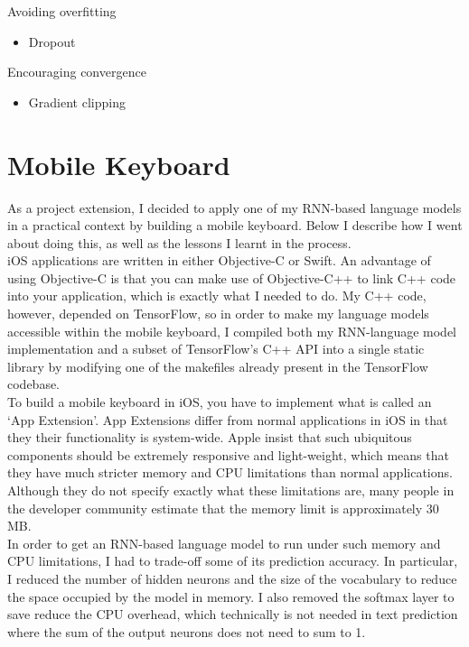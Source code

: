 \documentclass[a4paper, 12pt]{report}
\begin{document}
Avoiding overfitting
\begin{itemize}
\item
	Dropout
\end{itemize}

Encouraging convergence
\begin{itemize}
\item
	Gradient clipping
\end{itemize}

\section{Mobile Keyboard} \label{mobile_keyboard}

As a project extension, I decided to apply one of my RNN-based language models in a practical context by building a mobile keyboard. Below I describe how I went about doing this, as well as the lessons I learnt in the process. \\

iOS applications are written in either Objective-C or Swift. An advantage of using Objective-C is that you can make use of Objective-C++ to link C++ code into your application, which is exactly what I needed to do. My C++ code, however, depended on TensorFlow, so in order to make my language models accessible within the mobile keyboard, I compiled both my RNN-language model implementation and a subset of TensorFlow's C++ API into a single static library by modifying one of the makefiles already present in the TensorFlow codebase. \\

To build a mobile keyboard in iOS, you have to implement what is called an `App Extension'. App Extensions differ from normal applications in iOS in that they their functionality is system-wide. Apple insist that such ubiquitous components should be extremely responsive and light-weight, which means that they have much stricter memory and CPU limitations than normal applications. Although they do not specify exactly what these limitations are, many people in the developer community estimate that the memory limit is approximately 30 MB. \\

In order to get an RNN-based language model to run under such memory and CPU limitations, I had to trade-off some of its prediction accuracy. In particular, I reduced the number of hidden neurons and the size of the vocabulary to reduce the space occupied by the model in memory. I also removed the softmax layer to save reduce the CPU overhead, which technically is not needed in text prediction where the sum of the output neurons does not need to sum to 1.
\end{document}
